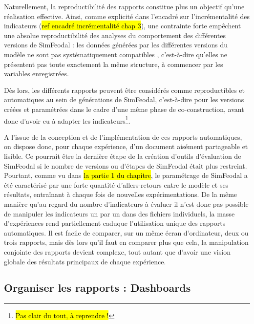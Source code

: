 %
%


	Naturellement, la reproductibilité des rapports constitue plus un objectif qu'une réalisation effective.
	Ainsi, comme explicité dans l'encadré sur l'incrémentalité des indicateurs (\hl{ref encadré incrémentalité chap 3}), une contrainte forte empêchent une absolue reproductibilité des analyses du comportement des différentes versions de SimFeodal : les données générées par les différentes versions du modèle ne sont pas systématiquement \og compatibles \fg{}, c'est-à-dire qu'elles ne présentent pas toute exactement la même structure, à commencer par les variables enregistrées.

	Dès lors, les différents rapports peuvent être considérés comme reproductibles et automatiques au sein de \og générations \fg{} de SimFeodal, c'est-à-dire pour les versions créées et paramétrées dans le cadre d'une même phase de co-construction, avant donc d'avoir eu à adapter les indicateurs\footnote{
	\hl{Pas clair du tout, à reprendre !}
	}.

	A l'issue de la conception et de l'implémentation de ces rapports automatiques, on dispose donc, pour chaque expérience, d'un document aisément partageable et lisible.
	Ce pourrait être la dernière étape de la création d'outils d'évaluation de SimFeodal si le nombre de versions ou d'étapes de SimFeodal était plus restreint.
	Pourtant, comme vu dans \hl{la partie 1 du chapitre}, le paramétrage de SimFeodal a été caractérisé par une forte quantité d'allers-retours entre le modèle et ses résultats, entraînant à chaque fois de nouvelles expérimentations.
	De la même manière qu'au regard du nombre d'indicateurs à évaluer il n'est donc pas possible de manipuler les indicateurs un par un dans des fichiers individuels, la masse d'expériences rend partiellement caduque l'utilisation unique des rapports automatiques.
	Il est facile de comparer, sur un même écran d'ordinateur, deux ou trois rapports, mais dès lors qu'il faut en comparer plus que cela, la manipulation conjointe des rapports devient complexe, tout autant que d'avoir une vision globale des résultats principaux de chaque expérience.

	\subsection{Organiser les rapports : Dashboards}\label{subsec:dashboards}

